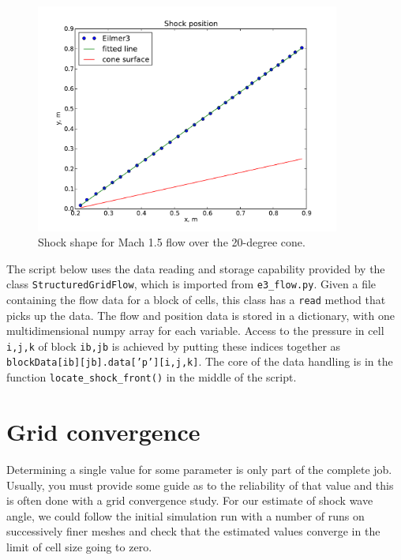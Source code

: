 \begin{figure}[htbp]
\begin{center}
\includegraphics[width=10cm]{../2D/cone20-simple/shock-shape.pdf}
\end{center}
\caption{Shock shape for Mach 1.5 flow over the 20-degree cone.}
\label{cone20-shock-points-fig}
\end{figure}

\clearpage

The script below uses the data reading and storage capability provided by 
the class \texttt{StructuredGridFlow}, which is imported from \texttt{e3\_flow.py}.
Given a file containing the flow data for a block of cells, this class has a \texttt{read} 
method that picks up the data.
The flow and position data is stored in a dictionary, with one multidimensional numpy array 
for each variable.
Access to the pressure in cell \texttt{i,j,k} of block \texttt{ib,jb} is achieved by
putting these indices together as \texttt{blockData[ib][jb].data['p'][i,j,k]}.
The core of the data handling is in the function \texttt{locate\_shock\_front()}
in the middle of the script.

\noindent
\topbar

\bottombar

\section{Grid convergence}
%
Determining a single value for some parameter is only part of the complete job.
Usually, you must provide some guide as to the reliability of that value and
this is often done with a grid convergence study.
For our estimate of shock wave angle, we could follow the initial simulation run with a 
number of runs on successively finer meshes and check that the estimated values converge 
in the limit of cell size going to zero.


